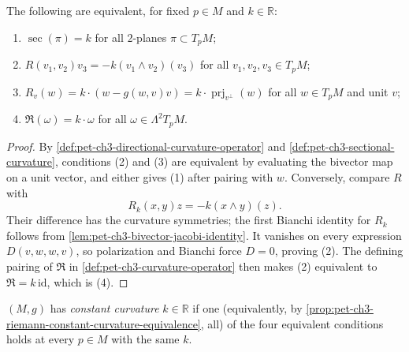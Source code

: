 \begin{proposition}
  \label{prop:pet-ch3-riemann-constant-curvature-equivalence}
  \leanok
  The following are equivalent, for fixed $p\in M$ and $k\in\mathbb R$:
  \begin{enumerate}
    \item[(1)] $\sec(\pi)=k$ for all $2$-planes $\pi\subset T_pM$;
    \item[(2)] $R(v_1,v_2)v_3=-k(v_1\wedge v_2)(v_3)$ for all $v_1,v_2,v_3\in T_pM$;
    \item[(3)] $R_v(w)=k\cdot(w-g(w,v)v)=k\cdot\operatorname{prj}_{v^\perp}(w)$ for all
    $w\in T_pM$ and unit $v$;
    \item[(4)] $\mathfrak R(\omega)=k\cdot\omega$ for all $\omega\in\Lambda^2T_pM$.
  \end{enumerate}
\end{proposition}
\begin{proof}
  \leanok
  \sketch
  By \cref{def:pet-ch3-directional-curvature-operator} and
  \cref{def:pet-ch3-sectional-curvature},
  conditions (2) and (3) are equivalent by evaluating the bivector map on a
  unit vector, and either gives (1) after pairing with $w$. Conversely, compare
  $R$ with
  \[
   R_k(x,y)z=-k(x\wedge y)(z).
  \]
  Their difference has the curvature symmetries; the first Bianchi identity for
  $R_k$ follows from \cref{lem:pet-ch3-bivector-jacobi-identity}. It vanishes on
  every expression $D(v,w,w,v)$, so polarization and Bianchi force $D=0$,
  proving (2). The defining pairing of $\mathfrak R$ in
  \cref{def:pet-ch3-curvature-operator} then makes (2) equivalent to
  $\mathfrak R=k\,\mathrm{id}$, which is (4).
\end{proof}

\begin{definition}
  \label{def:pet-ch3-constant-curvature}
  \leanok
  $(M,g)$ has \emph{constant curvature} $k\in\mathbb R$ if one (equivalently, by
  \cref{prop:pet-ch3-riemann-constant-curvature-equivalence}, all) of the four
  equivalent conditions holds at every $p\in M$ with the same $k$.
\end{definition}


